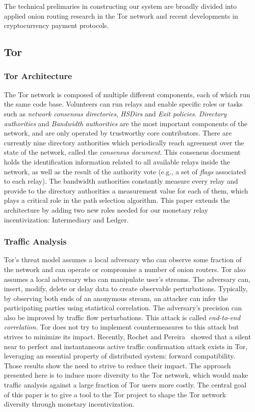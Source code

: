The technical prelimaries in constructing our system are broadly divided into
applied onion routing research in the Tor network and recent developments
in cryptocurrency payment protocols.

\subsection{Tor}

\subsubsection{Tor Architecture}
The Tor network is composed of multiple different components, each of which run
the same code base. Volunteers can run relays and enable specific roles or tasks
such as \textit{network consensus directories}, \textit{HSDirs} and \textit{Exit
  policies}. \textit{Directory authorities} and \textit{Bandwidth authorities}
are the most important components of the network, and are only operated by
trustworthy core contributors. There are currently nine directory authorities
which periodically reach agreement over the state of the network, called the
\textit{consensus document}. This consensus document holds the identification
information related to all available relays inside the network, as well as the
result of the authority vote (e.g., a set of \textit{flags} associated to each
relay). The bandwidth authorities constantly measure every relay and provide to
the directory authorities a measurement value for each of them, which plays a
critical role in the path selection algorithm. This paper extends the
architecture by adding two new roles needed for our monetary relay
incentivization: Intermediary and Ledger.

\subsubsection{Traffic Analysis}
Tor's threat model assumes a local adversary who can observe some fraction of
the network and can operate or compromise a number of onion routers. Tor also
assumes a local adversary who can manipulate user's streams. The adversary can,
insert, modify, delete or delay data to create observable
perturbations. Typically, by observing both ends of an anonymous stream, an
attacker can infer the participating parties using statistical correlation. The
adversary's precision can also be improved by traffic flow perturbations. This
attack is called \textit{end-to-end correlation}. Tor does not try to implement
countermeasures to this attack but strives to minimize its impact. Recently,
Rochet and Pereira~\cite{rochet2018dropping} showed that a silent near to perfect
and instantaneous active traffic confirmation attack exists in Tor, leveraging
an essential property of distributed system: forward compatibility. Those
results show the need to strive to reduce their impact. The approach presented
here is to induce more diversity to the Tor network, which would make traffic
analysis against a large fraction of Tor users more costly. The central goal of
this paper is to give a tool to the Tor project to shape the Tor network
diversity through monetary incentivization.

